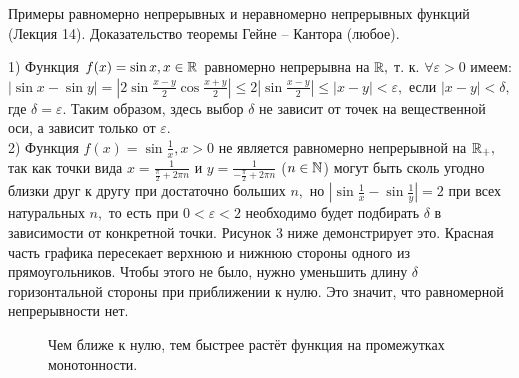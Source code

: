 \newpage

\begin{problem}
Примеры равномерно непрерывных и неравномерно непрерывных функций (Лекция
14). Доказательство теоремы Гейне – Кантора (любое).
\end{problem}

\begin{example}
    1) Функция $f(x)=\sin x, x \in \mathbb{R}$
    равномерно непрерывна на $\mathbb{R},$ т. к.
    $\forall \varepsilon>0$
    имеем: $|\sin x-\sin y|=
        |2\sin\frac{x-y}{2}\cos\frac{x+y}{2}|
        \leq2|\sin\frac{x-y}{2}|\leq|x-y|<\varepsilon,$
    если $|x-y|<\delta,$ где $\delta=
        \varepsilon.$ Таким образом, здесь выбор
    $\delta$ не зависит от точек на вещественной
    оси, а зависит только от $\varepsilon.$\\
    2) Функция $f(x)=\sin\frac{1}{x}, x > 0$
    не является равномерно непрерывной на $\mathbb{R}_+,$
    так как точки вида $x=\frac{1}{\frac{\pi}{2}+
            2\pi n}$ и $y=\frac{1}{-\frac{\pi}{2}+2\pi n}$
    ($n \in \mathbb{N}$) могут быть сколь угодно близки
    друг к другу при достаточно больших $n,$
    но $|\sin\frac{1}{x}-\sin\frac{1}{y}|=2$
    при всех натуральных $n,$ то есть при
    $0<\varepsilon<2$ необходимо будет подбирать
    $\delta$ в зависимости от конкретной точки.
    Рисунок 3 ниже демонстрирует это.
    Красная часть графика пересекает верхнюю
    и нижнюю стороны одного из
    прямоугольников. Чтобы этого не было,
    нужно уменьшить длину $\delta$ горизонтальной
    стороны при приближении к нулю. Это значит,
    что равномерной непрерывности нет.\begin{figure}[h!]
        \caption{Чем ближе к нулю, тем быстрее растёт функция на промежутках монотонности.}
        \label{fig:image}
    \end{figure}
\end{example}

